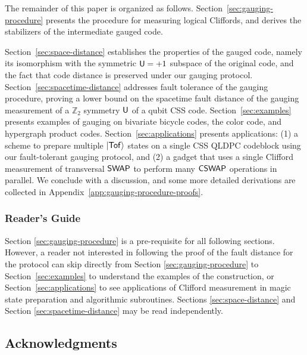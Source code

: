 \documentclass[11pt]{article}
\begin{document}
The remainder of this paper is organized as follows.
Section~\ref{sec:gauging-procedure} presents the procedure for measuring logical Cliffords, and derives the stabilizers of the intermediate gauged code.

Section~\ref{sec:space-distance} establishes the properties of the gauged code, namely its isomorphism with the symmetric $\mathsf{U}= +1$ subspace of the original code, and the fact that code distance is preserved under our gauging protocol.
Section~\ref{sec:spacetime-distance} addresses fault tolerance of the gauging procedure, proving a lower bound on the spacetime fault distance of the gauging measurement of a $\mathbb{Z}_2$ symmetry $\mathsf{U}$ of a qubit CSS code.
Section~\ref{sec:examples} presents examples of gauging on bivariate bicycle codes, the color code, and hypergraph product codes.
Section~\ref{sec:applications} presents applications: (1) a scheme to prepare multiple $\ket{\mathsf{Tof}}$ states on a single CSS QLDPC codeblock using our fault-tolerant gauging protocol, and (2) a gadget that uses a single Clifford measurement of transversal $\mathsf{SWAP}$ to perform many $\mathsf{CSWAP}$ operations in parallel.
We conclude with a discussion, and some more detailed derivations are collected in Appendix~\ref{app:gauging-procedure-proofs}.

\subsubsection*{Reader's Guide }

Section \ref{sec:gauging-procedure} is a pre-requisite for all following sections. However, a reader not interested in following the proof of the fault distance for the protocol can skip directly from Section \ref{sec:gauging-procedure} to Section~\ref{sec:examples} to understand the examples of the construction, or Section~\ref{sec:applications} to see applications of Clifford measurement in magic state preparation and algorithmic subroutines.
Sections \ref{sec:space-distance} and Section \ref{sec:spacetime-distance} may be read independently.

\subsection*{Acknowledgments}
\end{document}
